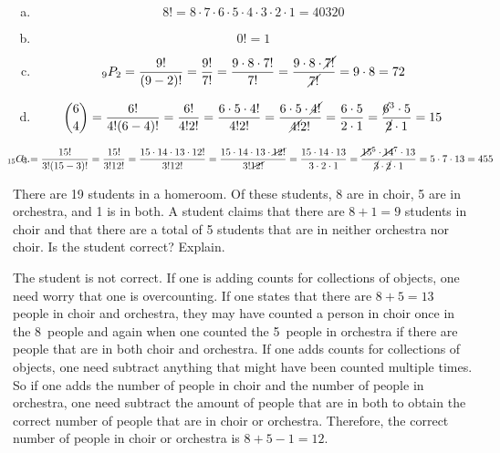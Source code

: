 \documentclass[11pt,letterpaper]{article}
\begin{document}
\sol 
\begin{enumerate}[(a)]
\item 
	\[
	8!= 8 \cdot 7 \cdot 6 \cdot 5 \cdot 4 \cdot 3 \cdot 2 \cdot 1= 40320
	\] \pspace

\item 
	\[
	0!= 1
	\] \pspace

\item 
	\[
	_9P_2= \dfrac{9!}{(9 - 2)!}= \dfrac{9!}{7!}= \dfrac{9 \cdot 8 \cdot 7!}{7!}= \dfrac{9 \cdot 8 \cdot \cancel{7!}}{\cancel{7!}}= 9 \cdot 8= 72
	\] \pspace

\item 
	\[
	\binom{6}{4}= \dfrac{6!}{4! (6 - 4)!}= \dfrac{6!}{4! 2!}= \dfrac{6 \cdot 5 \cdot 4!}{4! 2!}= \dfrac{6 \cdot 5 \cdot \cancel{4!}}{\cancel{4!} 2!}= \dfrac{6 \cdot 5}{2 \cdot 1}= \dfrac{\cancel{6}^3 \cdot 5}{\cancel{2} \cdot 1}= 15
	\] \pspace

\item 
	\[
	\hspace{-1cm} _{15}C_3= \dfrac{15!}{3! (15 - 3)!}= \dfrac{15!}{3! 12!}= \dfrac{15 \cdot 14 \cdot 13 \cdot 12!}{3! 12!}=  \dfrac{15 \cdot 14 \cdot 13 \cdot \cancel{12!}}{3! \cancel{12!}}= \dfrac{15 \cdot 14 \cdot 13}{3 \cdot 2 \cdot 1}= \dfrac{\cancel{15}^5 \cdot \cancel{14}^7 \cdot 13}{\cancel{3} \cdot \cancel{2} \cdot 1}= 5 \cdot 7 \cdot 13= 455
	\]
\end{enumerate}



\newpage



 There are 19 students in a homeroom. Of these students, 8 are in choir, 5 are in orchestra, and 1 is in both. A student claims that there are $8 + 1= 9$ students in choir and that there are a total of 5 students that are in neither orchestra nor choir. Is the student correct? Explain. \pspace

\sol The student is not correct. If one is adding counts for collections of objects, one need worry that one is overcounting. If one states that there are $8 + 5= 13$ people in choir and orchestra, they may have counted a person in choir once in the 8~people and again when one counted the 5~people in orchestra if there are people that are in both choir and orchestra. If one adds counts for collections of objects, one need subtract anything that might have been counted multiple times. So if one adds the number of people in choir and the number of people in orchestra, one need subtract the amount of people that are in both to obtain the correct number of people that are in choir or orchestra. Therefore, the correct number of people in choir or orchestra is $8 + 5 - 1= 12$. 
\end{document}
